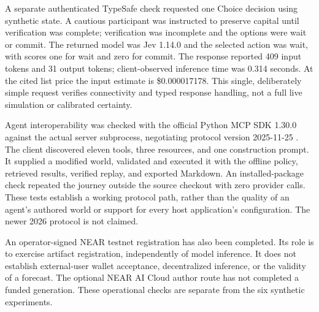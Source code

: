 A separate authenticated TypeSafe check requested one Choice decision using
synthetic state. A cautious participant was instructed to preserve capital
until verification was complete; verification was incomplete and the options
were wait or commit. The returned model was Jev 1.14.0 and the selected action
was wait, with scores one for wait and zero for commit. The response reported
409 input tokens and 31 output tokens; client-observed inference time was
0.314 seconds. At the cited list price the input estimate is \$0.000017178.
This single, deliberately simple request verifies connectivity and typed
response handling, not a full live simulation or calibrated certainty.

Agent interoperability was checked with the official Python MCP SDK 1.30.0
against the actual server subprocess, negotiating protocol version 2025-11-25
\cite{mcp2025}. The client discovered eleven tools, three resources, and one
construction prompt. It supplied a modified world, validated and executed it
with the offline policy, retrieved results, verified replay, and exported
Markdown. An installed-package check repeated the journey outside the source
checkout with zero provider calls. These tests establish a working protocol
path, rather than the quality of an agent's authored world or support for
every host application's configuration. The newer 2026 protocol is not claimed.

An operator-signed NEAR testnet registration has also been completed.
Its role is to exercise artifact registration, independently of model inference.
It does not establish external-user wallet acceptance, decentralized inference,
or the validity of a forecast. The optional NEAR AI Cloud author route has
not completed a funded generation. These operational checks are separate
from the six synthetic experiments.
